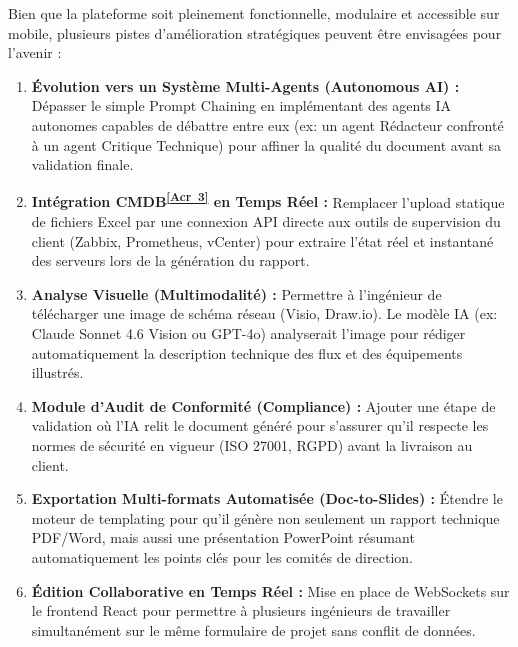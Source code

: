 \documentclass[12pt, a4paper]{report}
\newcommand{\acref}[1]{\textsuperscript{\hyperlink{acr:#1}{[Acr~#1]}}}
\begin{document}
Bien que la plateforme soit pleinement fonctionnelle, modulaire et accessible sur mobile, plusieurs pistes d’amélioration stratégiques peuvent être envisagées pour l'avenir :

\begin{enumerate}
    \item \textbf{Évolution vers un Système Multi-Agents (Autonomous AI) :}
    Dépasser le simple Prompt Chaining en implémentant des agents IA autonomes capables de débattre entre eux (ex: un agent Rédacteur confronté à un agent Critique Technique) pour affiner la qualité du document avant sa validation finale.
    
    \item \textbf{Intégration CMDB\acref{3} en Temps Réel :}
    Remplacer l'upload statique de fichiers Excel par une connexion API directe aux outils de supervision du client (Zabbix, Prometheus, vCenter) pour extraire l'état réel et instantané des serveurs lors de la génération du rapport.
    
    \item \textbf{Analyse Visuelle (Multimodalité) :}
    Permettre à l'ingénieur de télécharger une image de schéma réseau (Visio, Draw.io). Le modèle IA (ex: Claude Sonnet 4.6 Vision ou GPT-4o) analyserait l'image pour rédiger automatiquement la description technique des flux et des équipements illustrés.
    
    \item \textbf{Module d'Audit de Conformité (Compliance) :}
    Ajouter une étape de validation où l'IA relit le document généré pour s'assurer qu'il respecte les normes de sécurité en vigueur (ISO 27001, RGPD) avant la livraison au client.
    
    \item \textbf{Exportation Multi-formats Automatisée (Doc-to-Slides) :}
    Étendre le moteur de templating pour qu'il génère non seulement un rapport technique PDF/Word, mais aussi une présentation PowerPoint résumant automatiquement les points clés pour les comités de direction.
    
    \item \textbf{Édition Collaborative en Temps Réel :}
    Mise en place de WebSockets sur le frontend React pour permettre à plusieurs ingénieurs de travailler simultanément sur le même formulaire de projet sans conflit de données.
\end{enumerate}
\end{document}
